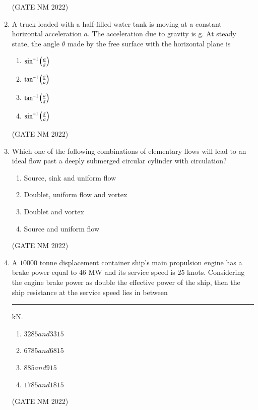 \documentclass[journal,12pt,onecolumn]{IEEEtran}
\theoremstyle{remark}
\begin{document}
\begin{enumerate}
\hfill(GATE NM 2022)

\item  A truck loaded with a half-filled water tank is moving at a constant horizontal acceleration $a$. The acceleration due to gravity is g. At steady state, the angle $\theta$ made by the free surface with the horizontal plane is
	\begin{multicols}{4}
\begin{enumerate}
	\item $\sin^{-1}\left(\frac{a}{g}\right)$
	\item $\tan^{-1}\left(\frac{g}{a}\right)$
	\item $\tan^{-1}\left(\frac{a}{g}\right)$
	\item $\sin^{-1}\left(\frac{g}{a}\right)$
\end{enumerate}
	\end{multicols}

\hfill(GATE NM 2022)

\item  Which one of the following combinations of elementary flows will lead to an ideal flow past a deeply submerged circular cylinder with circulation?
\begin{enumerate}
    \item Source, sink and uniform flow
    \item Doublet, uniform flow and vortex
    \item Doublet and vortex
    \item Source and uniform flow
\end{enumerate}

\hfill(GATE NM 2022)

\item  A $10000$ tonne displacement container ship's main propulsion engine has a brake power equal to $46$ MW  and its service speed is $25$ knots. Considering the engine brake power as double the effective power of the ship, then the ship resistance at the service speed lies in between \rule{3cm}{0.15mm}  kN.
	\begin{multicols}{2}
\begin{enumerate}
    \item $3285 and 3315$
    \item $6785 and 6815$
    \item $885 and 915$
    \item $1785 and 1815$
\end{enumerate}
	\end{multicols}

\hfill (GATE NM 2022)


\end{enumerate}
\end{document}
